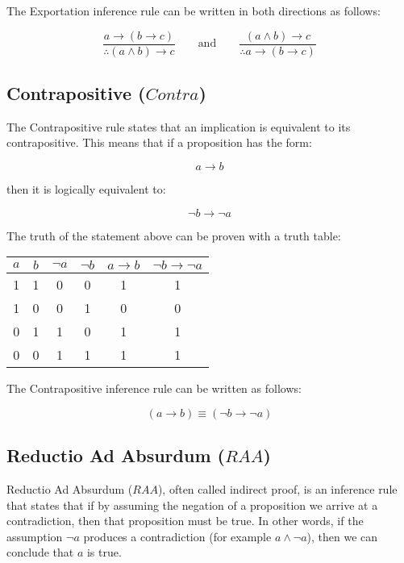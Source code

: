 \documentclass[12pt,a4paper,openany]{article}
\begin{document}
The Exportation inference rule can be written in both directions as follows:

\[
\frac{a \rightarrow (b \rightarrow c)}{\therefore (a \land b) \rightarrow c}
\qquad \text{and} \qquad
\frac{(a \land b) \rightarrow c}{\therefore a \rightarrow (b \rightarrow c)}
\]

\subsection{Contrapositive (\(Contra\))}\label{contrapositive-contra}

The Contrapositive rule states that an implication is equivalent to its contrapositive. This means that if a proposition has the form:

\[a \rightarrow b\]

then it is logically equivalent to:

\[\lnot b \rightarrow \lnot a\]

The truth of the statement above can be proven with a truth table:

\begin{center}
\begin{tabular}{|c|c|c|c|c|c|}
\hline
\(a\) & \(b\) & \(\lnot a\) & \(\lnot b\) & \(a \rightarrow b\) & \(\lnot b \rightarrow \lnot a\) \\
\hline
1 & 1 & 0 & 0 & 1 & 1 \\
1 & 0 & 0 & 1 & 0 & 0 \\
0 & 1 & 1 & 0 & 1 & 1 \\
0 & 0 & 1 & 1 & 1 & 1 \\
\hline
\end{tabular}
\end{center}

The Contrapositive inference rule can be written as follows:

\[
(a \rightarrow b) \equiv (\lnot b \rightarrow \lnot a)
\]

\subsection{Reductio Ad Absurdum (\(RAA\))}\label{reductio-ad-absurdum-raa}

Reductio Ad Absurdum (\(RAA\)), often called indirect proof, is an inference rule that states that if by assuming the negation of a proposition we arrive at a contradiction, then that proposition must be true. In other words, if the assumption \(\neg a\) produces a contradiction (for example \(a \land \neg a\)), then we can conclude that \(a\) is true.
\end{document}
